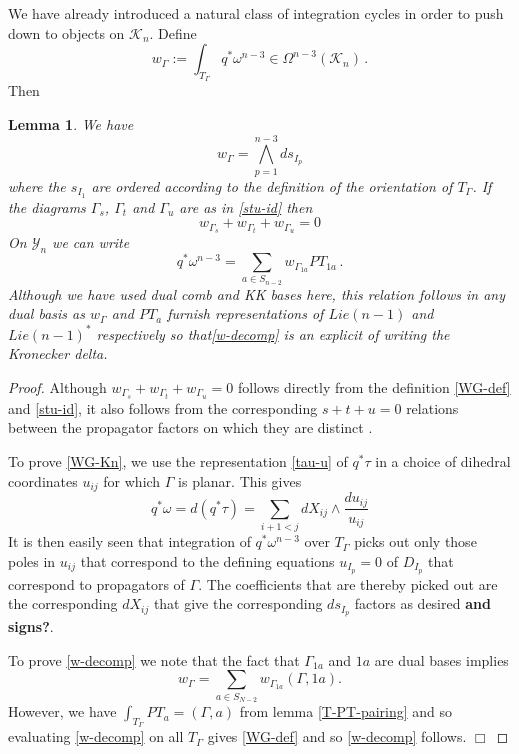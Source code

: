 \documentclass[11pt]{article}
\newcommand{\cK}{\mathcal{K}}
\newcommand{\cY}{\mathcal{Y}}
\newcommand{\1}{{\rm 1\hskip-0.25em I}}
\newtheorem{lemma}{Lemma}[section]
\begin{document}
We have already introduced a natural class of integration cycles in order to push down to objects on $\cK_n$.  
Define
\begin{equation}  
w_\Gamma:=\int_{T_\Gamma} q^* \omega^{n-3} \in \Omega^{n-3}(\cK_n)\, .\label{WG-def}
\end{equation}
Then
\begin{lemma}  We have
\begin{equation}
w_\Gamma=\bigwedge_{p=1}^{n-3} ds_{I_p} \label{WG-Kn}
\end{equation}
where the $s_{I_1}$ are ordered according to the definition of the orientation of $T_\Gamma$.  If the diagrams $\Gamma_s$, $\Gamma_t$ and $\Gamma_u$ are as in \eqref{stu-id} then \begin{equation}
 w_{\Gamma_s}+w_{\Gamma_t}+w_{\Gamma_u}=0 \label{WG-stu}
\end{equation}
On $\cY_n$ we can write
\begin{equation}
q^*\omega^{n-3}=\sum_{a\in S_{n-2}} w_{\Gamma_{1a}}  PT_{1a}\, .
\label{w-decomp}
\end{equation}
Although we have used dual comb and KK bases here, this relation follows in any dual basis as $w_\Gamma$ and $PT_a$ furnish representations of $Lie(n-1)$ and $Lie(n-1)^*$ respectively so that\eqref{w-decomp} is an explicit of writing the Kronecker delta.
\end{lemma}

\begin{proof}
Although $w_{\Gamma_s}+w_{\Gamma_t}+w_{\Gamma_u}=0$ follows directly from the  definition \eqref{WG-def} and \eqref{stu-id}, it also follows from the corresponding $s+t+u=0$ relations between the propagator factors on which they are distinct \cite{Arkani-Hamed:2017mur}.  

To prove \eqref{WG-Kn}, we use the representation \eqref{tau-u} of $q^*\tau$ in a choice of dihedral coordinates $u_{ij}$ for which $\Gamma$ is planar. This gives
\begin{equation}
q^*\omega=d(q^*\tau)=\sum_{i+1<j} d X_{ij}\wedge\frac{du_{ij}}{u_{ij}}
\end{equation}
 It is then easily seen that integration of $q^*\omega^{n-3}$  over $T_\Gamma$ picks out only those poles in $u_{ij}$ that correspond to the defining equations  $u_{I_p}=0$ of $D_{I_p}$  that correspond to propagators of $\Gamma$.  The coefficients that are thereby picked out are the corresponding $dX_{ij}$ that give the corresponding $ds_{I_p}$ factors as desired {\bf and signs?}.

To prove \eqref{w-decomp} we note that the fact that $\Gamma_{1a}$ and $1a$ are dual bases implies 
\begin{equation}
w_\Gamma=\sum_{a\in S_{N-2}} w_{\Gamma_{1a}} (\Gamma,1a).  
\end{equation}
However, we have $\int_{T_\Gamma} PT_a=(\Gamma,a)$ from lemma \ref{T-PT-pairing} and so evaluating \eqref{w-decomp} on all $T_\Gamma$ gives \eqref{WG-def} and so \eqref{w-decomp} follows. $\Box$
\end{proof}
\end{document}
